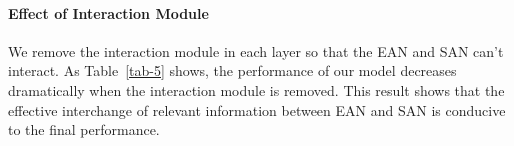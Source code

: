 \documentclass[11pt]{article}
\begin{document}
\begin{table}[htbp]
\centering
{}
\caption{Results on experiments whether considering speaker information or not in SAN.}
\label{tab-4}
\end{table}



\paragraph{Effect of Interaction Module}
We remove the interaction module in each layer so that the EAN and SAN can't interact. As Table~\ref{tab-5} shows, the performance of our model decreases dramatically when the interaction module is removed. This result shows that the effective interchange of relevant information between EAN and SAN is conducive to the final performance.
\begin{table}[htbp]
\centering
{}
\caption{Results on experiments whether removing interaction module or not in TSAM.}
\label{tab-5}
\end{table}
\end{document}

